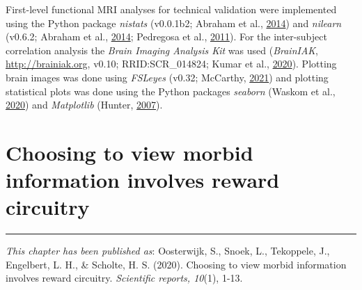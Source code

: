 \documentclass[11pt,american,a4paper,oneside,]{memoir} %
\begin{document}
First-level functional MRI analyses for technical validation were implemented using the Python package \emph{nistats} (v0.0.1b2; Abraham et al., \protect\hyperlink{ref-Abraham2014-ef}{2014}) and \emph{nilearn} (v0.6.2; Abraham et al., \protect\hyperlink{ref-Abraham2014-ef}{2014}; Pedregosa et al., \protect\hyperlink{ref-pedregosa2011scikit}{2011}). For the inter-subject correlation analysis the \emph{Brain Imaging Analysis Kit} was used (\emph{BrainIAK}, \url{http://brainiak.org}, v0.10; RRID:SCR\_014824; Kumar et al., \protect\hyperlink{ref-Kumar2020-eo}{2020}). Plotting brain images was done using \emph{FSLeyes} (v0.32; McCarthy, \protect\hyperlink{ref-McCarthy2019-yt}{2021}) and plotting statistical plots was done using the Python packages \emph{seaborn} (Waskom et al., \protect\hyperlink{ref-Waskom2020-qq}{2020}) and \emph{Matplotlib} (Hunter, \protect\hyperlink{ref-Hunter2007-at}{2007}).

\hypertarget{morbid-curiosity}{%
\chapter{Choosing to view morbid information involves reward circuitry}\label{morbid-curiosity}}


\vspace*{\fill}

\begin{center}\rule{0.5\linewidth}{0.5pt}\end{center}

\small

\noindent
\emph{This chapter has been published as}: Oosterwijk, S., Snoek, L., Tekoppele, J., Engelbert, L. H., \& Scholte, H. S. (2020). Choosing to view morbid information involves reward circuitry. \emph{Scientific reports, 10}(1), 1-13.

\newpage
\normalsize
\end{document}
